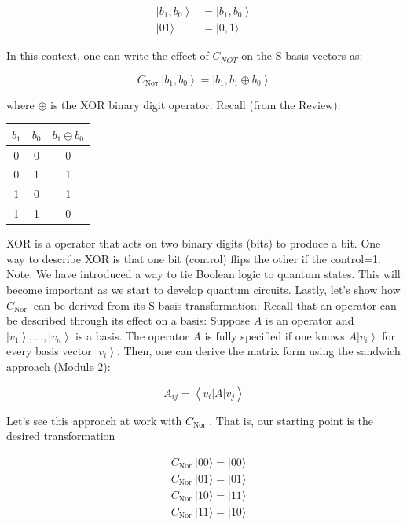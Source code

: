 \documentclass[main.tex]{subfiles}
\begin{document}
    $$
    \begin{aligned}
    \left|b_{1}, b_{0}\right\rangle &=\left|b_{1}, b_{0}\right\rangle \\
    |01\rangle &=|0,1\rangle
    \end{aligned}
    $$
    
    In this context, one can write the effect of $C_{N O T}$ on the S-basis vectors as:
    
    $$
    C_{\text {Noт }}\left|b_{1}, b_{0}\right\rangle=\left|b_{1}, b_{1} \oplus b_{0}\right\rangle
    $$
    
    where $\oplus$ is the XOR binary digit operator. Recall (from the Review):
    
    \begin{tabular}{|c|c|c|}
    \hline$b_{1}$ & $b_{0}$ & $b_{1} \oplus b_{0}$ \\
    \hline 0 & 0 & 0 \\
    \hline 0 & 1 & 1 \\
    \hline 1 & 0 & 1 \\
    \hline 1 & 1 & 0 \\
    \hline
    \end{tabular}
    
    XOR is a operator that acts on two binary digits (bits) to produce a bit. One way to describe XOR is that one bit (control) flips the other if the control=1. Note: We have introduced a way to tie Boolean logic to quantum states. This will become important as we start to develop quantum circuits. Lastly, let's show how $C_{\text {Nor }}$ can be derived from its S-basis transformation: Recall that an operator can be described through its effect on a basis: Suppose $A$ is an operator and $\left|v_{1}\right\rangle, \ldots,\left|v_{n}\right\rangle$ is a basis. The operator $A$ is fully specified if one knows $A\left|v_{i}\right\rangle$ for every basis vector $\left|v_{i}\right\rangle$. Then, one can derive the matrix form using the sandwich approach (Module 2):
    
    $$
    A_{i j}=\left\langle v_{i}|A| v_{j}\right\rangle
    $$
    
    Let's see this approach at work with $C_{\text {Nог }}$. That is, our starting point is the desired transformation
    
    $$
    \begin{aligned}
    &C_{\text {Nor }}|00\rangle=|00\rangle \\
    &C_{\text {Nor }}|01\rangle=|01\rangle \\
    &C_{\text {Nor }}|10\rangle=|11\rangle \\
    &C_{\text {Nor }}|11\rangle=|10\rangle
    \end{aligned}
    $$
    
\end{document}
